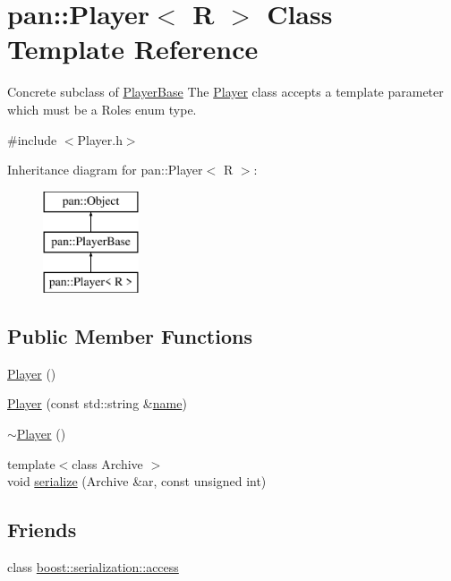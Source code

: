 \hypertarget{classpan_1_1_player}{}\section{pan\+:\+:Player$<$ R $>$ Class Template Reference}
\label{classpan_1_1_player}


Concrete subclass of \hyperlink{classpan_1_1_player_base}{Player\+Base} The \hyperlink{classpan_1_1_player}{Player} class accepts a template parameter which must be a Roles enum type.  




{\ttfamily \#include $<$Player.\+h$>$}

Inheritance diagram for pan\+:\+:Player$<$ R $>$\+:\begin{figure}[H]
\begin{center}
\leavevmode
\includegraphics[height=3.000000cm]{classpan_1_1_player}
\end{center}
\end{figure}
\subsection*{Public Member Functions}
\begin{DoxyCompactItemize}
\item 
\hyperlink{classpan_1_1_player_a107eee283242e1a091c19bf801ace02e}{Player} ()
\item 
\hyperlink{classpan_1_1_player_a342d676058285ed15edcb47fc233594b}{Player} (const std\+::string \&\hyperlink{classpan_1_1_player_base_a95bf8887210003d8780dec9d84743a64}{name})
\item 
\hyperlink{classpan_1_1_player_a7571870e341d4413df5e9253ce36534f}{$\sim$\+Player} ()
\item 
{\footnotesize template$<$class Archive $>$ }\\void \hyperlink{classpan_1_1_player_a7aa4f9237095b37b3796f98436bca7bc}{serialize} (Archive \&ar, const unsigned int)
\end{DoxyCompactItemize}
\subsection*{Friends}
\begin{DoxyCompactItemize}
\item 
class \hyperlink{classpan_1_1_player_ac98d07dd8f7b70e16ccb9a01abf56b9c}{boost\+::serialization\+::access}
\end{DoxyCompactItemize}
